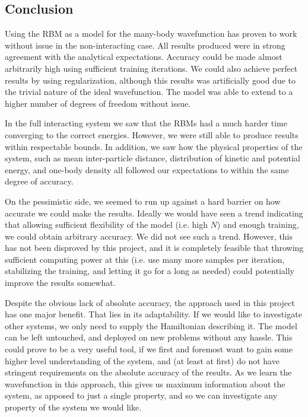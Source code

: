 \documentclass[a4paper, 11pt]{article}
\begin{document}
\begin{multicols}{2}

    \section{Conclusion}

    Using the RBM as a model for the many-body wavefunction has proven to work
    without issue in the non-interacting case. All results produced were in
    strong agreement with the analytical expectations. Accuracy could be made
    almost arbitrarily high using sufficient training iterations. We could also
    achieve perfect results by using regularization, although this results was
    artificially good due to the trivial nature of the ideal wavefunction. The
    model was able to extend to a higher number of degrees of freedom without
    issue. 

    In the full interacting system we saw that the RBMs had a much harder time
    converging to the correct energies. However, we were still able to produce
    results within respectable bounds. In addition, we saw how the physical
    properties of the system, such as mean inter-particle distance, distribution
    of kinetic and potential energy, and one-body density all followed our
    expectations to within the same degree of accuracy.

    On the pessimistic side, we seemed to run up against a hard barrier on how
    accurate we could make the results. Ideally we would have seen a trend
    indicating that allowing sufficient flexibility of the model (i.e. high $N$)
    and enough training, we could obtain arbitrary accuracy. We did not see such
    a trend. However, this has not been disproved by this project, and it is
    completely feasible that throwing sufficient computing power at this (i.e.
    use many more samples per iteration, stabilizing the training, and letting
    it go for a long as needed) could potentially improve the results somewhat. 

    Despite the obvious lack of absolute accuracy, the approach used in this
    project has one major benefit. That lies in its adaptability. If we would
    like to investigate other systems, we only need to supply the Hamiltonian
    describing it. The model can be left untouched, and deployed on new problems
    without any hassle. This could prove to be a very useful tool, if we first
    and foremost want to gain some higher level understanding of the system, and
    (at least at first) do not have stringent requirements on the absolute
    accuracy of the results. As we learn the wavefunction in this approach, this
    gives us maximum information about the system, as apposed to just a single
    property, and so we can investigate any property of the system we would
    like.

    \printbibliography
\end{multicols}
\end{document}
